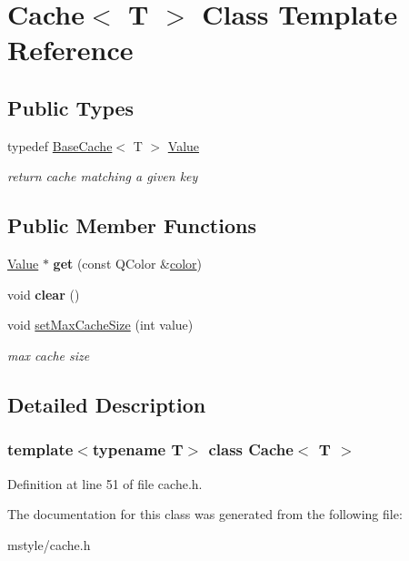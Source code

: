 \hypertarget{class_cache}{}\section{Cache$<$ T $>$ Class Template Reference}
\label{class_cache}
\subsection*{Public Types}
\begin{DoxyCompactItemize}
\item 
\mbox{\label{class_cache_a5224563729c915f5d429d5ac7f469e5f}} 
typedef \hyperlink{class_base_cache}{Base\+Cache}$<$ T $>$ \hyperlink{class_cache_a5224563729c915f5d429d5ac7f469e5f}{Value}
\begin{DoxyCompactList}\small\item\em return cache matching a given key \end{DoxyCompactList}\end{DoxyCompactItemize}
\subsection*{Public Member Functions}
\begin{DoxyCompactItemize}
\item 
\mbox{\label{class_cache_a203e8055f77e2691d1e664d248b8924e}} 
\hyperlink{class_cache_a5224563729c915f5d429d5ac7f469e5f}{Value} $\ast$ {\bfseries get} (const Q\+Color \&\hyperlink{structcolor}{color})
\item 
\mbox{\label{class_cache_abaa266792e11c359517a9a32f73aca16}} 
void {\bfseries clear} ()
\item 
\mbox{\label{class_cache_a67d49938cee1e3c934f92bed1d2ed1c1}} 
void \hyperlink{class_cache_a67d49938cee1e3c934f92bed1d2ed1c1}{set\+Max\+Cache\+Size} (int value)
\begin{DoxyCompactList}\small\item\em max cache size \end{DoxyCompactList}\end{DoxyCompactItemize}


\subsection{Detailed Description}
\subsubsection*{template$<$typename T$>$\newline
class Cache$<$ T $>$}



Definition at line 51 of file cache.\+h.



The documentation for this class was generated from the following file\+:\begin{DoxyCompactItemize}
\item 
mstyle/cache.\+h\end{DoxyCompactItemize}
